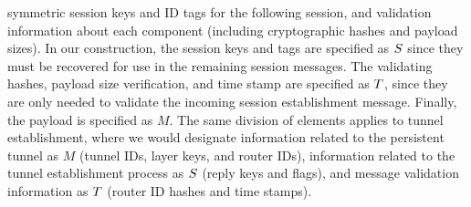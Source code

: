 \begin{itemize}
symmetric session keys and ID tags for the following session, and validation information about each component (including cryptographic
hashes and payload sizes).  In our construction, the session keys and tags are specified as $S$ since they must be recovered for
use in the remaining session messages. The validating hashes, payload size verification, and time stamp are specified as $T$, since they
are only needed to validate the incoming session establishment message.  Finally, the payload is specified as $M$.  The same division
of elements applies to tunnel establishment, where we would designate information related to the persistent tunnel as $M$ (tunnel IDs,
layer keys, and router IDs), information related to the tunnel establishment process as $S$ (reply keys and flags), and
message validation information as $T$ (router ID hashes and time stamps).  

\end{itemize}
